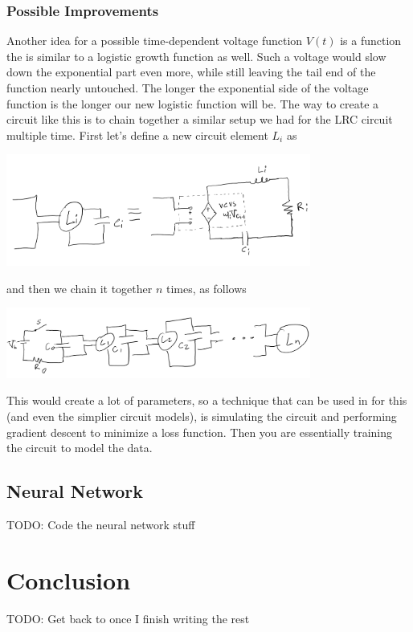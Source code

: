 \documentclass{report}
\begin{document}
            \subsubsection{Possible Improvements}
                Another idea for a possible time-dependent voltage function $V(t)$ is a function the is similar to a logistic growth function as well. Such a voltage would slow down the exponential part even more, while still leaving the tail end of the function nearly untouched. The longer the exponential side of the voltage function is the longer our new logistic function will be.
                \newline\indent
                The way to create a circuit like this is to chain together a similar setup we had for the LRC circuit multiple time. First let's define a new circuit element $L_i$ as
                \begin{center}
                    \includegraphics[width=10cm]{drawings/Li.png}
                \end{center}
                and then we chain it together $n$ times, as follows
                \begin{center}
                    \includegraphics[width=10cm]{drawings/chain.png}
                \end{center}
                This would create a lot of parameters, so a technique that can be used in for this (and even the simplier circuit models), is simulating the circuit and performing gradient descent to minimize a loss function. Then you are essentially training the circuit to model the data.
        \subsection{Neural Network}
            TODO: Code the neural network stuff
    \section{Conclusion}
        TODO: Get back to once I finish writing the rest
\end{document}
